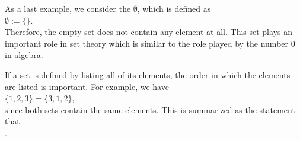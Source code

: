 As a last example, we consider the  $\emptyset$, which is defined as
\\[0.2cm]
\hspace*{1.3cm}
$\emptyset := \{\}$.
\\[0.2cm]
Therefore, the empty set does not contain any element at all.  This set plays an important role in set theory which
is similar to the role played by the number $0$ in algebra.

If a set is defined by listing all of its elements, the order in which the
elements are listed is  important.  For example, we have
\\[0.2cm]
\hspace*{1.3cm}
$\{1,2,3\} = \{3,1,2\}$,
\\[0.2cm]
since both sets contain the same elements.   
This is summarized as the statement that 
\\[0.2cm]
\hspace*{1.3cm}
. 



